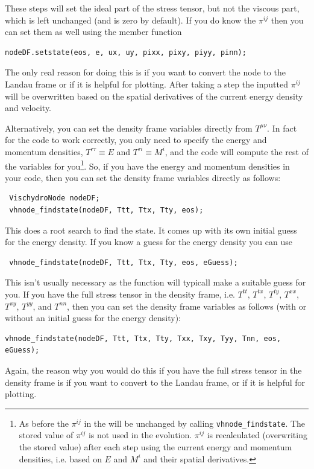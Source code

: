 \documentclass[12pt]{article}
\begin{document}
These steps will set the ideal part of the stress tensor, but not the viscous part, which is left unchanged (and is zero by default).  
If you do know the $\pi^{ij}$ then you can set them as well using the member function
\begin{verbatim}
nodeDF.setstate(eos, e, ux, uy, pixx, pixy, piyy, pinn);
\end{verbatim}  
The only real reason for doing this is if you want to convert the node to the
Landau frame or if it is helpful for plotting.  After taking a step the inputted
$\pi^{ij}$ will be overwritten based on the spatial derivatives of the current
energy density and velocity.

Alternatively, you can set the density frame variables directly from
$T^{\mu\nu}$. In fact for the code to work correctly, you only need to specify
the energy and momentum densities, $T^{\tau\tau}\equiv E$ and $T^{\tau i}\equiv
M^i$, and the code will compute the rest of the variables for you\footnote{As before the
$\pi^{ij}$ in the will be unchanged by calling {\tt vhnode\_findstate}.
The stored value of $\pi^{ij}$ is not used in the evolution. $\pi^{ij}$ is recalculated (overwriting the stored value) after each step using the current energy and momentum densities, i.e. based on $E$ and $M^i$ and their spatial derivatives.
}.  
So,  if you have the energy and momentum densities in your code, then you can set the density frame variables directly as follows:
\begin{verbatim}
 VischydroNode nodeDF;
 vhnode_findstate(nodeDF, Ttt, Ttx, Tty, eos);
\end{verbatim}
This does a root search to find the state. It comes up with its own initial guess for the energy density.  If you know a guess for the energy
density  you can use 
 \begin{verbatim}
 vhnode_findstate(nodeDF, Ttt, Ttx, Tty, eos, eGuess); 
 \end{verbatim}
 This isn't usually necessary as the function will typicall make a suitable guess for you. If you have the full stress tensor in the density frame, i.e. $T^{tt}$, $T^{tx}$, $T^{ty}$, $T^{xx}$, $T^{xy}$, $T^{yy}$, and $T^{nn}$, then you can set the density frame variables as follows (with or without an initial guess for the energy density):
\begin{verbatim}
vhnode_findstate(nodeDF, Ttt, Ttx, Tty, Txx, Txy, Tyy, Tnn, eos, eGuess); 
\end{verbatim}
Again, the reason why you would do this if you have the full stress tensor in the density frame is if you want to convert to the Landau frame, or if it is helpful for plotting.
\end{document}
